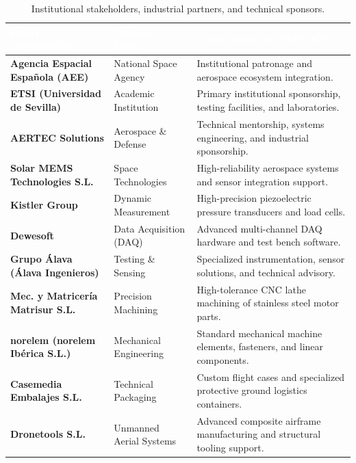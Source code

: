 \documentclass[11pt, a4paper]{article} %
\begin{document}
\begin{table}[H]
\centering
\caption{Institutional stakeholders, industrial partners, and technical sponsors.}
\label{tab:sponsors_partners}
\renewcommand{\arraystretch}{1.2}
\begin{tabularx}{\textwidth}{|>{\raggedright\arraybackslash}p{4.2cm}|>{\raggedright\arraybackslash}p{3.8cm}|X|}
\hline
\rowcolor{EtseNavy}
\textbf{\textcolor{white}{Entity / Organization}} & \textbf{\textcolor{white}{Domain / Sector}} & \textbf{\textcolor{white}{Contribution to NAOS EVO}} \\ \hline
\textbf{Agencia Espacial Española (AEE)} & National Space Agency & Institutional patronage and aerospace ecosystem integration. \\ \hline
\rowcolor{LightGrayTable}
\textbf{ETSI (Universidad de Sevilla)} & Academic Institution & Primary institutional sponsorship, testing facilities, and laboratories. \\ \hline
\textbf{AERTEC Solutions} & Aerospace \& Defense & Technical mentorship, systems engineering, and industrial sponsorship. \\ \hline
\rowcolor{LightGrayTable}
\textbf{Solar MEMS Technologies S.L.} & Space Technologies & High-reliability aerospace systems and sensor integration support. \\ \hline
\textbf{Kistler Group} & Dynamic Measurement & High-precision piezoelectric pressure transducers and load cells. \\ \hline
\rowcolor{LightGrayTable}
\textbf{Dewesoft} & Data Acquisition (DAQ) & Advanced multi-channel DAQ hardware and test bench software. \\ \hline
\textbf{Grupo Álava (Álava Ingenieros)} & Testing \& Sensing & Specialized instrumentation, sensor solutions, and technical advisory. \\ \hline
\rowcolor{LightGrayTable}
\textbf{Mec. y Matricería Matrisur S.L.} & Precision Machining & High-tolerance CNC lathe machining of stainless steel motor parts. \\ \hline
\textbf{norelem (norelem Ibérica S.L.)} & Mechanical Engineering & Standard mechanical machine elements, fasteners, and linear components. \\ \hline
\rowcolor{LightGrayTable}
\textbf{Casemedia Embalajes S.L.} & Technical Packaging & Custom flight cases and specialized protective ground logistics containers. \\ \hline
\textbf{Dronetools S.L.} & Unmanned Aerial Systems & Advanced composite airframe manufacturing and structural tooling support. \\ \hline

\end{tabularx}
\end{table}
\end{document}
